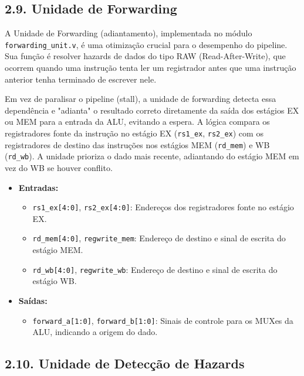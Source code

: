 \documentclass[12pt, a4paper]{article}
\begin{document}
\subsection*{2.9. Unidade de Forwarding}

A Unidade de Forwarding (adiantamento), implementada no módulo \texttt{forwarding\_unit.v}, é uma otimização crucial para o desempenho do pipeline. Sua função é resolver hazards de dados do tipo RAW (Read-After-Write), que ocorrem quando uma instrução tenta ler um registrador antes que uma instrução anterior tenha terminado de escrever nele.

Em vez de paralisar o pipeline (stall), a unidade de forwarding detecta essa dependência e "adianta" o resultado correto diretamente da saída dos estágios EX ou MEM para a entrada da ALU, evitando a espera. A lógica compara os registradores fonte da instrução no estágio EX (\texttt{rs1\_ex}, \texttt{rs2\_ex}) com os registradores de destino das instruções nos estágios MEM (\texttt{rd\_mem}) e WB (\texttt{rd\_wb}). A unidade prioriza o dado mais recente, adiantando do estágio MEM em vez do WB se houver conflito.

\begin{itemize}
    \item \textbf{Entradas:}
    \begin{itemize}
        \item \texttt{rs1\_ex[4:0]}, \texttt{rs2\_ex[4:0]}: Endereços dos registradores fonte no estágio EX.
        \item \texttt{rd\_mem[4:0]}, \texttt{regwrite\_mem}: Endereço de destino e sinal de escrita do estágio MEM.
        \item \texttt{rd\_wb[4:0]}, \texttt{regwrite\_wb}: Endereço de destino e sinal de escrita do estágio WB.
    \end{itemize}
    \item \textbf{Saídas:}
    \begin{itemize}
        \item \texttt{forward\_a[1:0]}, \texttt{forward\_b[1:0]}: Sinais de controle para os MUXes da ALU, indicando a origem do dado.
    \end{itemize}
\end{itemize}


\subsection*{2.10. Unidade de Detecção de Hazards}
\end{document}
